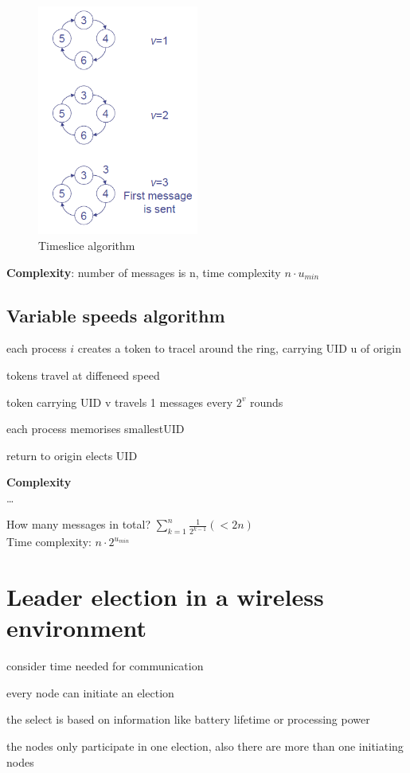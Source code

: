 \begin{figure}[h]
	\centering
	\includegraphics[width=200px]{gfx/timeslice.png}
	\caption{Timeslice algorithm}
	\label{img:timeslice}
\end{figure}

\textbf{Complexity}: number of messages is n, time complexity $n\cdot u_{min}$

\subsection{Variable speeds algorithm}
\begin{compactitem}
\item each process $i$ creates a token to tracel around the ring, carrying UID u of origin
\item tokens travel at diffeneed speed
\item token carrying UID v travels  1 messages every $2^{v}$ rounds
\item each process memorises smallestUID
\item return to origin elects UID
\end{compactitem}

\textbf{Complexity}\\
\dots


How many messages in total? $\sum\limits_{k=1}^n \frac{1}{2^{k-1}} (<2n)$\\
Time complexity: $n\cdot 2^{u_{min}}$

\section{Leader election in a wireless environment}
\begin{compactitem}
\item consider time needed for communication
\item every node can initiate an election
\item the select is based on information like battery lifetime or processing power
\item the nodes only participate in one election, also there are more than one initiating nodes
\end{compactitem}

